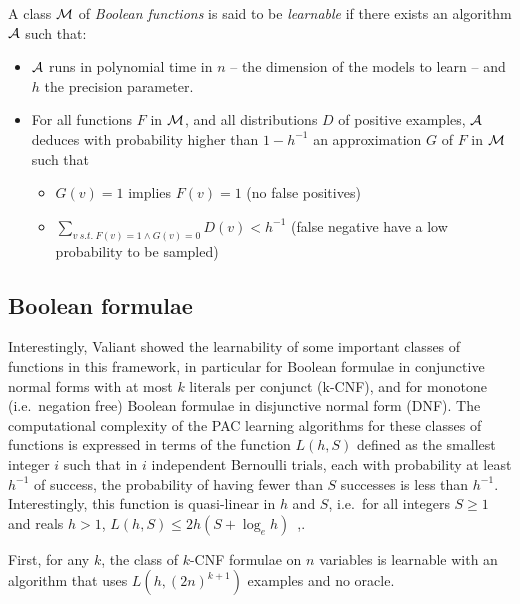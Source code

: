 \documentclass{llncs}
\begin{document}
\begin{definition}
	\label{def:learnclass}
   A class $\cal M$ of \emph{Boolean functions} is said to be \emph{learnable}
   if there exists an algorithm $\cal A$ such that:
   \begin{itemize}
      \item $\cal A$ runs in polynomial time in $n$ -- the dimension of the models to learn -- and $h$ the precision parameter.
      \item
         For all functions $F$ in $\cal M$, and all distributions $D$ of positive examples,
         $\cal A$ deduces with probability higher than $1-h^{-1}$ an approximation $G$ of $F$ in $\cal M$ such that
         \begin{itemize}
            \item $G(v)=1$ implies $F(v)=1$ (no false positives)
            \item
               $\sum_{v\ s.t.\ F(v)=1\wedge G(v)=0} D(v) < h^{-1}$ (false negative have a low probability to be sampled)
         \end{itemize}
   \end{itemize}
\end{definition}


\subsection{Boolean formulae}

Interestingly, Valiant showed the learnability of some important classes of functions in this framework,
in particular for Boolean formulae in conjunctive normal forms with at most $k$ literals per conjunct (k-CNF),
and for monotone (i.e.~negation free) Boolean formulae in disjunctive normal form (DNF).
The computational complexity of the PAC learning algorithms for these classes of functions is expressed in terms of the function
$L(h,S)$ defined as the smallest integer $i$ such that
in $i$ independent Bernoulli trials, each with probability at least $h^{-1}$ of success, the probability of having fewer than $S$ successes is less than $h^{-1}$.
Interestingly, this function is quasi-linear in $h$ and $S$, i.e.~for all
integers $S\ge 1$ and reals $h>1$, $L(h,S) \le 2h(S+\log_e h)$~\cite{Valiant84cacm},.

\begin{theorem}\label{thm:kcnf}
First, for any $k$, the class of $k$-CNF formulae on $n$ variables is learnable with an
algorithm that uses $L(h,{(2 n)}^{k+1})$ examples and no oracle.
\end{theorem}
\end{document}
